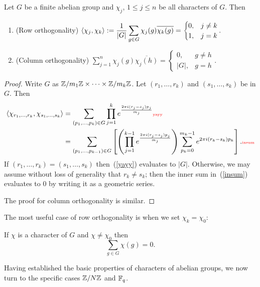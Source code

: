 \begin{thm}
Let $G$ be a finite abelian group and $\chi_j$, $1\leq j \leq n$ be all characters of $G$. Then
\begin{enumerate}
\item (Row orthogonality) $\left\langle {\chi_j,\chi_k}\right\rangle:=\displaystyle\frac{1}{|G|}\sum_{g\in G} \chi_j(g)\overline{\chi_k(g)}=\begin{cases} 0,&j\neq k\\ 1,&j=k\end{cases}$.
\item (Column orthogonality) $\displaystyle\sum_{j=1}^{n} \chi_j(g)\overline{\chi_j(h)}=\begin{cases} 0,&g\neq h\\ |G| ,&g=h\end{cases}$.
\end{enumerate}
\begin{proof}
Write $G$ as $\mathbb{Z}/{m_1}\mathbb{Z}\times \cdots \times \mathbb{Z}/{m_k}\mathbb{Z}$. Let $(r_1,\ldots, r_k)$ and $(s_1,\ldots,s_k)$ be in $G$. Then
\begin{align}
\an{\chi_{r_1,\ldots, r_k},\chi_{s_1,\ldots, s_k}}
&=\sum_{(p_1,\ldots, p_k)\in G}\prod_{j=1}^k e^{\frac{2\pi i(r_j-s_j)p_j} {m_j}}
\llabel{yayy}
\\
&=\sum_{(p_1,\ldots, p_{k-1})\in G}\ba{\pa{\prod_{j=1}^{k-1} e^{\frac{2\pi i(r_j-s_j)p_j} {m_j}}}\sum_{p_k=0}^{m_k-1} e^{2\pi i(r_k-s_k)p_k}}.
\llabel{insum}
\end{align}
If $(r_1,\ldots, r_k)=(s_1,\ldots, s_k)$ then~(\ref{yayy}) evaluates to $|G|$. Otherwise, we may assume without loss of generality that $r_k\neq s_k$; then the inner sum in~(\ref{insum}) evaluates to 0 by writing it as a geometric series.

The proof for column orthogonality is similar.
\end{proof}
\end{thm}
The most useful case of row orthogonality is when we set $\chi_k=\chi_0$:
\begin{cor}
If $\chi$ is a character of $G$ and $\chi\neq \chi_0$ then
\[\sum_{g\in G} \chi(g)=0.\]
\end{cor}
Having established the basic properties of characters of abelian groups, we now turn to the specific cases $\mathbb{Z}/N\mathbb{Z}$ and $\mathbb{F}_q$.
